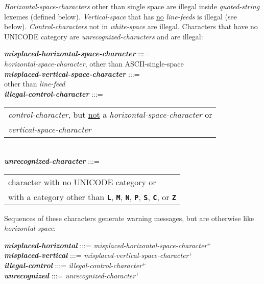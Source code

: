 \documentclass[12pt]{article}
\newcommand{\TT}[1]{{\tt \bfseries #1}}
\newcommand{\PLUS}[1][]{{$^{+#1}$}}
\newcommand{\emkey}[1]{{\em \bfseries #1}}
\newcommand{\EOL}{\penalty \exhyphenpenalty}
\newenvironment{indpar}[1][0.3in]%
	{\begin{list}{}%
		     {\setlength{\itemsep}{0in}%
		      \setlength{\topsep}{0in}%
		      \setlength{\parsep}{1ex}%
		      \setlength{\labelwidth}{#1}%
		      \setlength{\leftmargin}{#1}%
		      \addtolength{\leftmargin}{\labelsep}}%
	 \item}%
	{\end{list}}
\begin{document}
{\em Horizontal-\EOL space-\EOL characters}\label{ILLEGAL-CHARACTERS}
other than single
space are illegal inside {\em quoted-string} lexemes (defined below).
{\em Vertical-space} that has \underline{no} {\em line-feeds} is
illegal (see below).
{\em Control-characters} not in {\em white-space} are illegal.
Characters that have no UNICODE category are {\em unrecognized-characters}
and are illegal:
\begin{indpar}
\emkey{misplaced-horizontal-space-character} :::= \\
\hspace*{0.5in}
    {\em horizontal-space-character}, other than ASCII-single-space
\\[0.3ex]
\emkey{misplaced-vertical-space-character} :::= \\
\hspace*{0.5in}{\em vertical-space-character} other than {\em line-feed}
\\[0.3ex]
\emkey{illegal-control-character} :::= \\
\hspace*{0.5in}
    \begin{tabular}[t]{l}
    {\em control-character},
    but \underline{not} a {\em horizontal-space-character} or \\
    {\em vertical-space-character}
    \end{tabular}
\\[0.3ex]
\emkey{unrecognized-character} :::= \\
\hspace*{0.5in}
    \begin{tabular}[t]{l}
    character with no UNICODE category or \\
    with a category other than
    \TT{L}, \TT{M}, \TT{N}, \TT{P}, \TT{S}, \TT{C}, or \TT{Z}
    \end{tabular}
\end{indpar}

Sequences of these characters generate warning messages,
but are otherwise like {\em horizontal-space}:
\begin{indpar}
\emkey{misplaced-horizontal} :::=
    {\em misplaced-horizontal-space-character}\PLUS{}
\\[0.3ex]
\emkey{misplaced-vertical} :::=
    {\em misplaced-vertical-space-character}\PLUS{}
\\[0.3ex]
\emkey{illegal-control} :::= {\em illegal-control-character}\PLUS{}
\\[0.3ex]
\emkey{unrecognized} :::= {\em unrecognized-character}\PLUS{}
\end{indpar}
\end{document}
